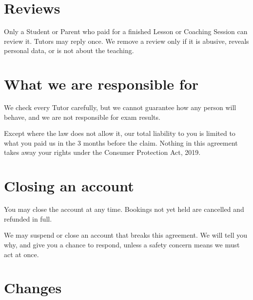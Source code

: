 \documentclass[11pt]{article}
\begin{document}
\section{Reviews}

\begin{clauses}
  \item Only a Student or Parent who paid for a finished Lesson or Coaching Session can review it. Tutors may reply once. We remove a review only if it is abusive, reveals personal data, or is not about the teaching.
\end{clauses}

\section{What we are responsible for}

\begin{clauses}
  \item We check every Tutor carefully, but we cannot guarantee how any person will behave, and we are not responsible for exam results.
  \item Except where the law does not allow it, our total liability to you is limited to what you paid us in the 3 months before the claim. Nothing in this agreement takes away your rights under the Consumer Protection Act, 2019.
\end{clauses}

\section{Closing an account}

\begin{clauses}
  \item You may close the account at any time. Bookings not yet held are cancelled and refunded in full.
  \item We may suspend or close an account that breaks this agreement. We will tell you why, and give you a chance to respond, unless a safety concern means we must act at once.
\end{clauses}

\section{Changes}
\end{document}
